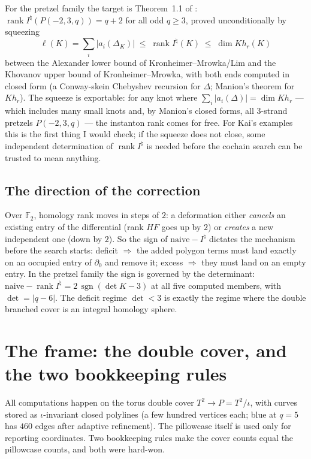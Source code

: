 \documentclass[11pt,reqno]{amsart}
\theoremstyle{plain}
\theoremstyle{definition}
\newcommand{\F}{\mathbb{F}}
\newcommand{\Inat}{I^{\natural}}
\newcommand{\HF}{\mathit{HF}}
\newcommand{\rk}{\operatorname{rank}}
\newcommand{\sgn}{\operatorname{sgn}}
\newcommand{\pill}{P}
\begin{document}
For the pretzel family the target is Theorem~1.1 of \cite{P2}:
$\rk\Inat(P(-2,3,q))=q+2$ for all odd $q\ge3$, proved unconditionally by squeezing
\[
   \ell(K)=\textstyle\sum_i|a_i(\Delta_K)|\;\le\;\rk\Inat(K)\;\le\;\dim\mathit{Kh}_r(K)
\]
between the Alexander lower bound of Kronheimer--Mrowka/Lim and the Khovanov upper bound of
Kronheimer--Mrowka, with both ends computed in closed form (a Conway-skein Chebyshev recursion
for $\Delta$; Manion's theorem for $\mathit{Kh}_r$). The squeeze is exportable: for any knot
where $\sum_i|a_i(\Delta)|=\dim\mathit{Kh}_r$ --- which includes many small knots and, by
Manion's closed forms, all $3$-strand pretzels $P(-2,3,q)$ --- the instanton rank comes for
free. For Kai's examples this is the first thing I would check; if the squeeze does not close,
some independent determination of $\rk\Inat$ is needed before the cochain search can be
trusted to mean anything.

\subsection{The direction of the correction}
Over $\F_2$, homology rank moves in steps of $2$: a deformation either \emph{cancels} an
existing entry of the differential (rank $\HF$ goes up by $2$) or \emph{creates} a new
independent one (down by $2$). So the sign of $\text{naive}-\Inat$ dictates the mechanism
before the search starts: deficit $\Rightarrow$ the added polygon terms must land exactly on an
occupied entry of $\partial_0$ and remove it; excess $\Rightarrow$ they must land on an empty
entry. In the pretzel family the sign is governed by the determinant:
$\text{naive}-\rk\Inat=2\,\sgn(\det K-3)$ at all five computed members, with $\det=|q-6|$.
The deficit regime $\det<3$ is exactly the regime where the double branched cover is an
integral homology sphere.

\section{The frame: the double cover, and the two bookkeeping rules}\label{sec:frame}

All computations happen on the torus double cover $T^2\to\pill=T^2/\iota$, with curves stored
as $\iota$-invariant closed polylines (a few hundred vertices each; blue at $q=5$ has $460$
edges after adaptive refinement). The pillowcase itself is used only for reporting
coordinates. Two bookkeeping rules make the cover counts equal the pillowcase counts, and both
were hard-won.
\end{document}
